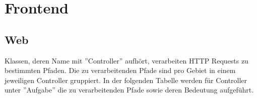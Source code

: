 
\section{Frontend}

\subsection{Web}


\noindent
Klassen, deren Name mit ''Controller'' aufhört, verarbeiten HTTP Requests zu bestimmten Pfaden.
Die zu verarbeitenden Pfade sind pro Gebiet in einem jeweiligen Controller gruppiert.
In der folgenden Tabelle werden für Controller unter ''Aufgabe'' die zu verarbeitenden Pfade sowie deren Bedeutung aufgeführt.

